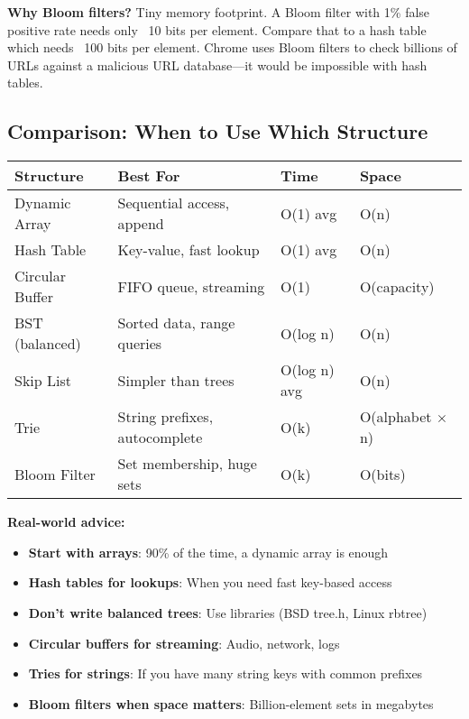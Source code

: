 \begin{notebox}
\textbf{Why Bloom filters?} Tiny memory footprint. A Bloom filter with 1\% false positive rate needs only ~10 bits per element. Compare that to a hash table which needs ~100 bits per element. Chrome uses Bloom filters to check billions of URLs against a malicious URL database---it would be impossible with hash tables.
\end{notebox}

\subsection{Comparison: When to Use Which Structure}

\begin{center}
\begin{tabular}{|l|l|l|l|}
\hline
\textbf{Structure} & \textbf{Best For} & \textbf{Time} & \textbf{Space} \\
\hline
Dynamic Array & Sequential access, append & O(1) avg & O(n) \\
Hash Table & Key-value, fast lookup & O(1) avg & O(n) \\
Circular Buffer & FIFO queue, streaming & O(1) & O(capacity) \\
BST (balanced) & Sorted data, range queries & O(log n) & O(n) \\
Skip List & Simpler than trees & O(log n) avg & O(n) \\
Trie & String prefixes, autocomplete & O(k) & O(alphabet $\times$ n) \\
Bloom Filter & Set membership, huge sets & O(k) & O(bits) \\
\hline
\end{tabular}
\end{center}

\begin{tipbox}
\textbf{Real-world advice:}
\begin{itemize}
    \item \textbf{Start with arrays}: 90\% of the time, a dynamic array is enough
    \item \textbf{Hash tables for lookups}: When you need fast key-based access
    \item \textbf{Don't write balanced trees}: Use libraries (BSD tree.h, Linux rbtree)
    \item \textbf{Circular buffers for streaming}: Audio, network, logs
    \item \textbf{Tries for strings}: If you have many string keys with common prefixes
    \item \textbf{Bloom filters when space matters}: Billion-element sets in megabytes
\end{itemize}
\end{tipbox}

